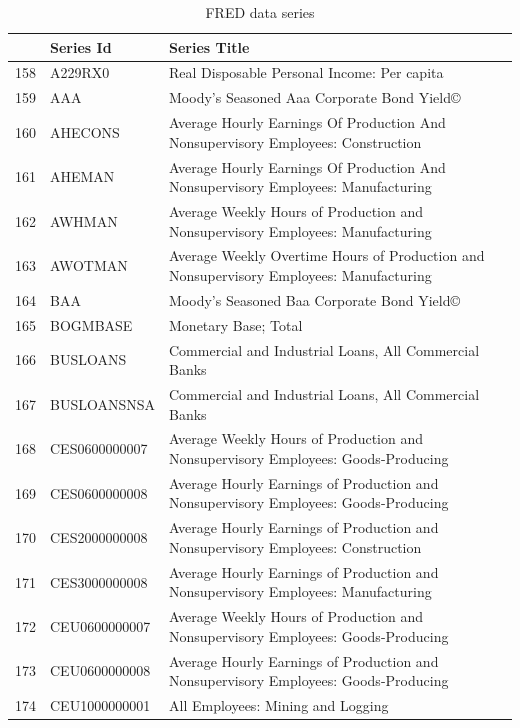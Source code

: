 \documentclass[12pt]{article}
\begin{document}
\begin{table}
\centering
\label{FRED data series}
\caption{FRED data series}
\begin{tabular}{rp{5cm}p{11cm}}
	& \textbf{Series Id} & \textbf{Series Title} \\
  \hline
  \hline
	158 & A229RX0 & Real Disposable Personal Income: Per capita \\
  \hline
	159 & AAA & Moody's Seasoned Aaa Corporate Bond Yield© \\
  \hline
	160 & AHECONS & Average Hourly Earnings Of Production And Nonsupervisory Employees: Construction \\
  \hline
	161 & AHEMAN & Average Hourly Earnings Of Production And Nonsupervisory Employees: Manufacturing \\
  \hline
	162 & AWHMAN & Average Weekly Hours of Production and Nonsupervisory Employees: Manufacturing \\ 
  \hline
	163 & AWOTMAN & Average Weekly Overtime Hours of Production and Nonsupervisory Employees: Manufacturing \\
  \hline
	164 & BAA & Moody's Seasoned Baa Corporate Bond Yield© \\
  \hline
	165 & BOGMBASE & Monetary Base; Total \\
  \hline
	166 & BUSLOANS & Commercial and Industrial Loans, All Commercial Banks \\
  \hline
	167 & BUSLOANSNSA & Commercial and Industrial Loans, All Commercial Banks \\
  \hline
	168 & CES0600000007 & Average Weekly Hours of Production and Nonsupervisory Employees: Goods-Producing \\
  \hline
	169 & CES0600000008 & Average Hourly Earnings of Production and Nonsupervisory Employees: Goods-Producing \\
  \hline
	170 & CES2000000008 & Average Hourly Earnings of Production and Nonsupervisory Employees: Construction \\
  \hline
	171 & CES3000000008 & Average Hourly Earnings of Production and Nonsupervisory Employees: Manufacturing \\
  \hline
	172 & CEU0600000007 & Average Weekly Hours of Production and Nonsupervisory Employees: Goods-Producing \\
  \hline
	173 & CEU0600000008 & Average Hourly Earnings of Production and Nonsupervisory Employees: Goods-Producing \\
  \hline
	174 & CEU1000000001 & All Employees: Mining and Logging \\

\end{tabular}
\end{table}
\end{document}
